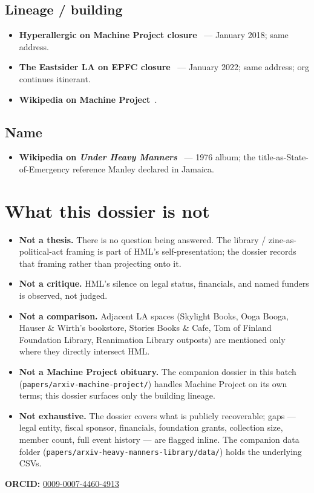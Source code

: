 \documentclass[10pt,letterpaper,twocolumn]{article}
\begin{document}
\subsection{Lineage / building}

\begin{itemize}
\item \textbf{Hyperallergic on Machine Project closure}~\citep{hyperallergicmachine2018} --- January 2018; same address.
\item \textbf{The Eastsider LA on EPFC closure}~\citep{eastsiderepfc2022} --- January 2022; same address; org continues itinerant.
\item \textbf{Wikipedia on Machine Project}~\citep{wikipediamachine}.
\end{itemize}

\subsection{Name}

\begin{itemize}
\item \textbf{Wikipedia on \emph{Under Heavy Manners}}~\citep{wikipediaprincefari} --- 1976 album; the title-as-State-of-Emergency reference Manley declared in Jamaica.
\end{itemize}

\section{What this dossier is not}

\begin{itemize}
\item \textbf{Not a thesis.} There is no question being answered. The library / zine-as-political-act framing is part of HML's self-presentation; the dossier records that framing rather than projecting onto it.
\item \textbf{Not a critique.} HML's silence on legal status, financials, and named funders is observed, not judged.
\item \textbf{Not a comparison.} Adjacent LA spaces (Skylight Books, Ooga Booga, Hauser \& Wirth's bookstore, Stories Books \& Cafe, Tom of Finland Foundation Library, Reanimation Library outposts) are mentioned only where they directly intersect HML.
\item \textbf{Not a Machine Project obituary.} The companion dossier in this batch (\texttt{papers/arxiv-machine-project/}) handles Machine Project on its own terms; this dossier surfaces only the building lineage.
\item \textbf{Not exhaustive.} The dossier covers what is publicly recoverable; gaps --- legal entity, fiscal sponsor, financials, foundation grants, collection size, member count, full event history --- are flagged inline. The companion data folder (\texttt{papers/arxiv-heavy-manners-library/data/}) holds the underlying CSVs.
\end{itemize}

\vspace{0.5em}
\noindent\textbf{ORCID:} \href{https://orcid.org/0009-0007-4460-4913}{0009-0007-4460-4913}



\end{document}
